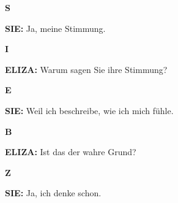 \documentclass{article}
\begin{document}
\vspace{0.5cm}

\begin{minipage}[t]{0.13\textwidth}
  \centering
  {\bfseries\fontsize{14.4}{14.4}\selectfont\textcolor{pastelgreen}{S}}
\end{minipage}%
\begin{minipage}[t]{0.81\textwidth}
  \textbf{SIE:} Ja, meine Stimmung.
\end{minipage}

\vspace{0.5cm}

\begin{minipage}[t]{0.13\textwidth}
  \centering
  {\bfseries\fontsize{14.4}{14.4}\selectfont\textcolor{pastelgreen}{I}}
\end{minipage}%
\begin{minipage}[t]{0.81\textwidth}
  \textbf{ELIZA:} Warum sagen Sie ihre Stimmung?
\end{minipage}

\vspace{0.5cm}

\begin{minipage}[t]{0.13\textwidth}
  \centering
  {\bfseries\fontsize{14.4}{14.4}\selectfont\textcolor{pastelgreen}{E}}
\end{minipage}%
\begin{minipage}[t]{0.81\textwidth}
  \textbf{SIE:} Weil ich beschreibe, wie ich mich fühle.
\end{minipage}

\vspace{0.5cm}

\begin{minipage}[t]{0.13\textwidth}
  \centering
  {\bfseries\fontsize{14.4}{14.4}\selectfont\textcolor{pastelgreen}{B}}
\end{minipage}%
\begin{minipage}[t]{0.81\textwidth}
  \textbf{ELIZA:} Ist das der wahre Grund?
\end{minipage}

\vspace{0.5cm}

\begin{minipage}[t]{0.13\textwidth}
  \centering
  {\bfseries\fontsize{14.4}{14.4}\selectfont\textcolor{pastelgreen}{Z}}
\end{minipage}%
\begin{minipage}[t]{0.81\textwidth}
  \textbf{SIE:} Ja, ich denke schon.
\end{minipage}
\end{document}
